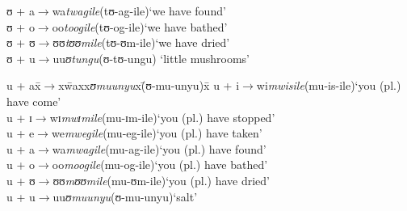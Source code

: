 \begin{exe}
\begin{tabbing}
		ʊ + a\>$\rightarrow$\>wa\>\textit{twagile}\>(\degree tʊ-ag-ile)\>`we have found'\\
		ʊ + o\>$\rightarrow$\>oo\>\textit{toogile}\>(\degree tʊ-og-ile)\>`we have bathed' \\
		ʊ + ʊ\>$\rightarrow$\>ʊʊ\>\textit{tʊʊmile}\>(\degree tʊ-ʊm-ile)\>`we have dried'\\
		ʊ + u\>$\rightarrow$\>uu\>\textit{ʊtungu}\>(\degree ʊ-tʊ-ungu) \> \lq little mushrooms' %
	\end{tabbing}
	\ex\label{exVowelContactu}\begin{tabbing}
		u + ax\=$\rightarrow$x\=waxx\=\textit{ʊmuunyu}x\=(\degree ʊ-mu-unyu)x\=\kill%
		u + i\>$\rightarrow$\>wi\>\textit{mwisile}\>(\degree mu-is-ile)\>`you (pl.) have come'\\
		u + ɪ\>$\rightarrow$\>wɪ\>\textit{mwɪmile}\>(\degree mu-ɪm-ile)\>`you (pl.) have stopped'\\
		u + e\>$\rightarrow$\>we\>\textit{mwegile}\>(\degree mu-eg-ile)\>`you (pl.) have taken'\\
		u + a\>$\rightarrow$\>wa\>\textit{mwagile}\>(\degree mu-ag-ile)\>`you (pl.) have found'\\
		u + o\>$\rightarrow$\>oo\>\textit{moogile}\>(\degree mu-og-ile)\>`you (pl.) have bathed' \\
		u + ʊ\>$\rightarrow$\>ʊʊ\>\textit{mʊʊmile}\>(\degree mu-ʊm-ile)\>`you (pl.) have dried'\\
		u + u\>$\rightarrow$\>uu\>\textit{ʊmuunyu}\>(\degree ʊ-mu-unyu)\>`salt'
	\end{tabbing}
\end{exe}

